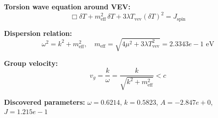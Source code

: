 
\textbf{Torsion wave equation around VEV:}
\begin{equation}
  \Box \delta T + m_{\text{eff}}^2 \, \delta T + 3\lambda T_{\text{vev}} (\delta T)^2 = J_{\text{spin}}
\end{equation}

\textbf{Dispersion relation:}
\begin{equation}
  \omega^2 = k^2 + m_{\text{eff}}^2, \quad
  m_{\text{eff}} = \sqrt{4\mu^2 + 3\lambda T_{\text{vev}}^2} = 2.3343e-1 \text{ eV}
\end{equation}

\textbf{Group velocity:}
\begin{equation}
  v_g = \frac{k}{\omega} = \frac{k}{\sqrt{k^2 + m_{\text{eff}}^2}} < c
\end{equation}

\textbf{Discovered parameters:}
$\omega = 0.6214$, \quad
$k = 0.5823$, \quad
$A = -2.847e+0$, \quad
$J = 1.215e-1$